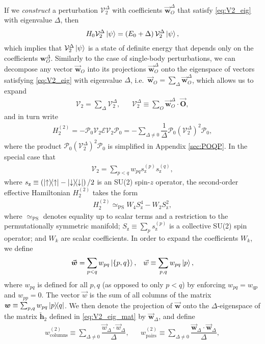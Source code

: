 \documentclass[nofootinbib,notitlepage,11pt]{revtex4-2}
\renewcommand{\t}{\text} %
\newcommand{\f}[2]{\dfrac{#1}{#2}} %
\newcommand{\p}[1]{\left(#1\right)} %
\renewcommand{\set}[1]{\left\{#1\right\}} %
\renewcommand{\c}{\cdot} %
\newcommand{\m}{\bm} %
\renewcommand{\v}{\vec} %
\newcommand{\1}{\mathds{1}}
\newcommand{\up}{\uparrow}
\newcommand{\dn}{\downarrow}
\newcommand{\z}{\text{z}}
\newcommand{\E}{\mathcal{E}}
\renewcommand{\P}{\mathcal{P}}
\newcommand{\V}{\mathcal{V}}
\newcommand{\PS}{\text{PS}}
\begin{document}
If we {\it construct} a perturbation $\V_2^\Delta$ with coefficients
$\v{\m w}_O^\Delta$ that satisfy \eqref{eq:V2_eig} with eigenvalue
$\Delta$, then
\begin{align}
  H_0 \V_2^\Delta \ket\psi = \p{E_0 + \Delta} \V_2^\Delta \ket\psi,
\end{align}
which implies that $\V_2^\Delta\ket\psi$ is a state of definite energy
that depends only on the coefficients $\m w_O^\Delta$.  Similarly to
the case of single-body perturbations, we can decompose any vector
$\v{\m w}_O$ into its projections $\v{\m w}_O^\Delta$ onto the
eigenspace of vectors satisfying \eqref{eq:V2_eig} with eigenvalue
$\Delta$, i.e.~$\v{\m w}_O=\sum_\Delta\v{\m w}_O^\Delta$, which allows
us to expand
\begin{align}
  \V_2 = \sum_\Delta \V_2^\Delta,
  &&
  \V_2^\Delta \equiv \sum_O \v{\m w}_O^\Delta \c \v{\m O},
\end{align}
and in turn write
\begin{align}
  H_2^{(2)} = - \P_0 \V_2 \E \V_2 \P_0
  = -\sum_{\Delta\ne0} \f1\Delta \P_0 \p{\V_2^\Delta}^2 \P_0,
\end{align}
where the product $\P_0 \p{\V_2^\Delta}^2 \P_0$ is simplified in
Appendix \ref{sec:POQP}.  In the special case that
\begin{align}
  \V_2 = \sum_{p<q} w_{pq} s_\z^{(p)} s_\z^{(q)},
\end{align}
where $s_\z\equiv\p{\op\up-\op\dn}/2$ is an SU(2) spin-$z$ operator,
the second-order effective Hamiltonian $H_2^{(2)}$ takes the form
\begin{align}
  H_2^{(2)} \simeq_\PS W_4 S_\z^4 - W_2 S_\z^2,
\end{align}
where $\simeq_\PS$ denotes equality up to scalar terms and a
restriction to the permutationally symmetric manifold;
$S_\z\equiv\sum_p s_\z^{(p)}$ is a collective SU(2) spin operator; and
$W_k$ are scalar coefficients.  In order to expand the coefficients
$W_k$, we define
\begin{align}
  \v{\m w}=\sum_{p<q} w_{pq} \ket{\set{p,q}},
  &&
  \v w \equiv \sum_{p,q} w_{pq} \ket{p},
\end{align}
where $w_{pq}$ is defined for all $p,q$ (as opposed to only $p<q$) by
enforcing $w_{pq}=w_{qp}$ and $w_{pp}=0$.  The vector $\v w$ is the
sum of all columns of the matrix
$\m w\equiv\sum_{p,q}w_{pq}\op{p}{q}$.  We then denote the projection
of $\v{\m w}$ onto the $\Delta$-eigenspace of the matrix
$\check{\m h}_2$ defined in \eqref{eq:V2_eig_mat} by
$\v{\m w}_\Delta$, and define
\begin{align}
  w_{\t{columns}}^{(2)} \equiv \sum_{\Delta\ne0}
  \f{\v w_\Delta\c\v w_\Delta}{\Delta},
  &&
  w_{\t{pairs}}^{(2)} \equiv \sum_{\Delta\ne0}
  \f{\v{\m w}_\Delta\c\v{\m w}_\Delta}{\Delta},
\end{align}
\end{document}
